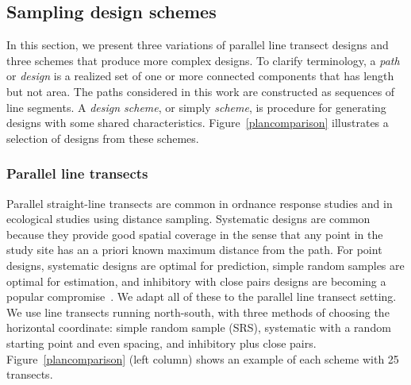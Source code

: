 \documentclass[review]{elsarticle}
\begin{document}
\subsection{Sampling design schemes}
\label{methodschemes}

In this section, we present three variations of parallel line transect designs
and three schemes that produce more complex designs. To clarify terminology, a
\emph{path} or \emph{design} is a realized set of one or more connected
components that has length but not area. The paths considered in this work are
constructed as sequences of line segments. A \emph{design scheme}, or simply
\emph{scheme}, is procedure for generating designs with some shared
characteristics. Figure~\ref{plancomparison} illustrates a selection of designs
from these schemes.


\subsubsection{Parallel line transects}

Parallel straight-line transects are common in ordnance response studies and in
ecological studies using distance sampling. Systematic designs are common
because they provide good spatial coverage in the sense that any point in the
study site has an a priori known maximum distance from the path. For point
designs, systematic designs are optimal for prediction, simple random samples
are optimal for estimation, and inhibitory with close pairs designs are
becoming a popular compromise~\citep{chipetaetal2017}. We adapt all of these to
the parallel line transect setting. We use line transects running north-south,
with three methods of choosing the horizontal coordinate: simple random sample
(SRS), systematic with a random starting point and even spacing, and inhibitory
plus close pairs. Figure~\ref{plancomparison} (left column) shows an example of
each scheme with 25 transects.

\end{document}

